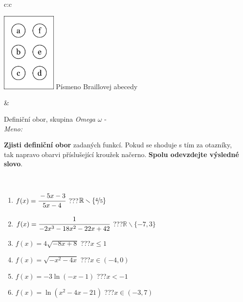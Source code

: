 \documentclass[10pt]{report}
\begin{document}
\begin{tabular}{c:c}
\begin{minipage}[c][104.5mm][t]{0.5\linewidth}
\begin{center}
\begin{minipage}{0.20\linewidth}
\begin{center}
\includegraphics[height=40mm]{../images/braille.png}
{\small Písmeno Braillovej abecedy}
\end{center}
\end{minipage}
\end{center}
\end{minipage}
&
\begin{minipage}[c][104.5mm][t]{0.5\linewidth}
\begin{center}
\vspace{7mm}
{\huge Definiční obor, skupina \textit{Omega $\omega$} -}\\[5mm]
\textit{Meno:}\phantom{xxxxxxxxxxxxxxxxxxxxxxxxxxxxxxxxxxxxxxxxxxxxxxxxxxxxxxxxxxxxxxxxx}\\[5mm]
\begin{minipage}{0.95\linewidth}
\textbf{Zjisti definiční obor} zadaných funkcí. Pokud se shoduje s tím za otazníky,\\tak napravo obarvi příslušející kroužek načerno. \textbf{Spolu odevzdejte výsledné slovo}.
\end{minipage}
\\[1mm]
\begin{minipage}{0.79\linewidth}
\begin{center}
\begin{varwidth}{\linewidth}
\begin{enumerate}
\normalsizerrr
\item $f(x)=\cfrac{-5x-3}{5x-4}$\quad \dotfill\; ???\;\dotfill \quad $\mathbb{R}\smallsetminus\{\nicefrac{4}{5}\}$
\item $f(x)=\cfrac{1}{-2x^3-18x^2-22x+42}$\quad \dotfill\; ???\;\dotfill \quad $\mathbb{R}\smallsetminus\{-7,3\}$
\item $f(x)=4\sqrt{-8x+8}$\quad \dotfill\; ???\;\dotfill \quad $x\leq1$
\item $f(x)=\sqrt{-x^2-4x}$\quad \dotfill\; ???\;\dotfill \quad $x\in(-4 , 0)$
\item $f(x)=-3\ln{(-x-1)}$\quad \dotfill\; ???\;\dotfill \quad $x<-1$
\item $f(x)=\ln{(x^2-4x-21)}$\quad \dotfill\; ???\;\dotfill \quad $x\in(-3 , 7)$

\end{enumerate}
\end{varwidth}
\end{center}
\end{minipage}
\end{center}
\end{minipage}
\end{tabular}
\end{document}
